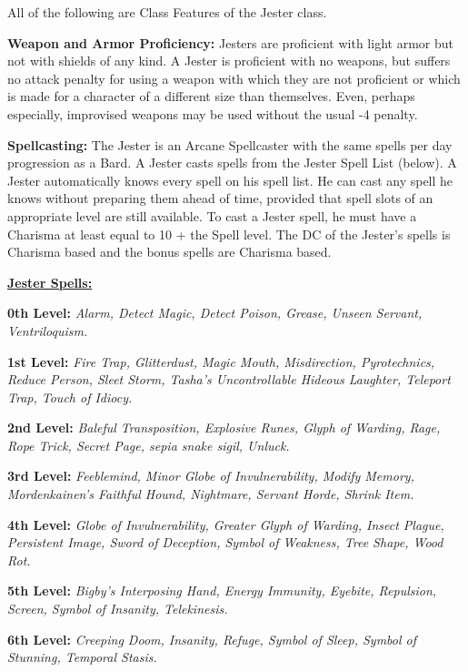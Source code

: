 \documentclass[10pt]{article}
\newcommand{\ability}[2]{\smallskip \noindent \textbf{#1} #2}
\newcommand{\spelllist}[1]{\smallskip \noindent \underline{\large \textbf{#1}}}
\begin{document}
\noindent All of the following are Class Features of the Jester class.

\ability{Weapon and Armor Proficiency:}{Jesters are proficient with light armor but not with shields of any kind. A Jester is proficient with no weapons, but suffers no attack penalty for using a weapon with which they are not proficient or which is made for a character of a different size than themselves. Even, perhaps especially, improvised weapons may be used without the usual -4 penalty.}

\ability{Spellcasting:}{The Jester is an Arcane Spellcaster with the same spells per day progression as a Bard. A Jester casts spells from the Jester Spell List (below). A Jester automatically knows every spell on his spell list. He can cast any spell he knows without preparing them ahead of time, provided that spell slots of an appropriate level are still available. To cast a Jester spell, he must have a Charisma at least equal to 10 + the Spell level. The DC of the Jester's spells is Charisma based and the bonus spells are Charisma based.}

\begin{floatingfigure}{3in}
\spelllist{Jester Spells:}

\ability{0th Level:}{\emph{Alarm, Detect Magic, Detect Poison, Grease, Unseen Servant, Ventriloquism.}}

\ability{1st Level:}{\emph{Fire Trap, Glitterdust, Magic Mouth, Misdirection, Pyrotechnics, Reduce Person, Sleet Storm, Tasha's Uncontrollable Hideous Laughter, Teleport Trap, Touch of Idiocy.}}

\ability{2nd Level:}{\emph{Baleful Transposition, Explosive Runes, Glyph of Warding, Rage, Rope Trick, Secret Page, sepia snake sigil, Unluck.}}

\ability{3rd Level:}{\emph{Feeblemind, Minor Globe of Invulnerability, Modify Memory, Mordenkainen's Faithful Hound, Nightmare, Servant Horde, Shrink Item.}}

\ability{4th Level:}{\emph{Globe of Invulnerability, Greater Glyph of Warding, Insect Plague, Persistent Image, Sword of Deception, Symbol of Weakness, Tree Shape, Wood Rot.}}

\ability{5th Level:}{\emph{Bigby's Interposing Hand, Energy Immunity, Eyebite, Repulsion, Screen, Symbol of Insanity, Telekinesis.}}

\ability{6th Level:}{\emph{Creeping Doom, Insanity, Refuge, Symbol of Sleep, Symbol of Stunning, Temporal Stasis.}}

\end{floatingfigure}
\end{document}
